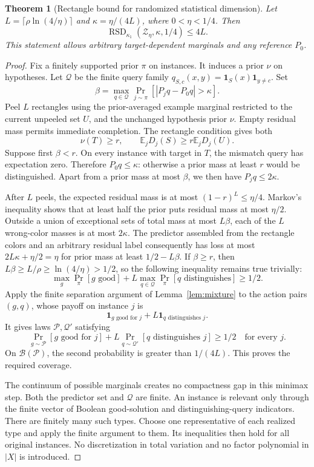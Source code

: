 \documentclass[11pt]{article}
\newtheorem{theorem}{Theorem}
\DeclareMathOperator{\RSD}{RSD}
\newcommand{\E}{\mathbb E}
\newcommand{\1}{\mathbf 1}
\begin{document}
\begin{theorem}[Rectangle bound for randomized statistical dimension]\label{thm:rsd}
Let $L=\lceil\rho\ln(4/\eta)\rceil$ and $\kappa=\eta/(4L)$, where $0<\eta<1/4$. Then
\[
 \RSD_{\kappa_1}(\mathcal Z_\eta,\kappa,1/4)\le4L.
\]
This statement allows arbitrary target-dependent marginals and any reference $P_0$.
\end{theorem}
\begin{proof}
Fix a finitely supported prior $\pi$ on instances. It induces a prior $\nu$ on hypotheses. Let $\mathcal Q$ be the finite query family $q_{S,c}(x,y)=\1_S(x)\1_{y\ne c}$. Set
\[
 \beta=\max_{q\in\mathcal Q}\Pr_{j\sim\pi}[|P_jq-P_0q|>\kappa].
\]
Peel $L$ rectangles using the prior-averaged example marginal restricted to the current unpeeled set $U$, and the unchanged hypothesis prior $\nu$. Empty residual mass permits immediate completion. The rectangle condition gives both
\[
 \nu(T)\ge r,\qquad \E_jD_j(S)\ge r\E_jD_j(U).
\]
Suppose first $\beta<r$. On every instance with target in $T$, the mismatch query has expectation zero. Therefore $P_0q\le\kappa$: otherwise a prior mass at least $r$ would be distinguished. Apart from a prior mass at most $\beta$, we then have $P_jq\le2\kappa$.

After $L$ peels, the expected residual mass is at most $(1-r)^L\le\eta/4$. Markov's inequality shows that at least half the prior puts residual mass at most $\eta/2$. Outside a union of exceptional sets of total mass at most $L\beta$, each of the $L$ wrong-color masses is at most $2\kappa$. The predictor assembled from the rectangle colors and an arbitrary residual label consequently has loss at most $2L\kappa+\eta/2=\eta$ for prior mass at least $1/2-L\beta$. If $\beta\ge r$, then $L\beta\ge L/\rho\ge\ln(4/\eta)>1/2$, so the following inequality remains true trivially:
\begin{equation}\label{eq:additive-game}
 \max_g\Pr_\pi[g\text{ good}]+L\max_{q\in\mathcal Q}\Pr_\pi[q\text{ distinguishes}]\ge1/2.
\end{equation}
Apply the finite separation argument of Lemma~\ref{lem:mixture} to the action pairs $(g,q)$, whose payoff on instance $j$ is
\[
 \1_{g\text{ good for }j}+L\1_{q\text{ distinguishes }j}.
\]
It gives laws $\mathcal P,\mathcal Q'$ satisfying
\[
 \Pr_{g\sim\mathcal P}[g\text{ good for }j]
 +L\Pr_{q\sim\mathcal Q'}[q\text{ distinguishes }j]\ge1/2
 \quad\text{for every }j.
\]
On $\mathcal B(\mathcal P)$, the second probability is greater than $1/(4L)$. This proves the required coverage.

The continuum of possible marginals creates no compactness gap in this minimax step. Both the predictor set and $\mathcal Q$ are finite. An instance is relevant only through the finite vector of Boolean good-solution and distinguishing-query indicators. There are finitely many such types. Choose one representative of each realized type and apply the finite argument to them. Its inequalities then hold for all original instances. No discretization in total variation and no factor polynomial in $|X|$ is introduced.
\end{proof}
\end{document}
